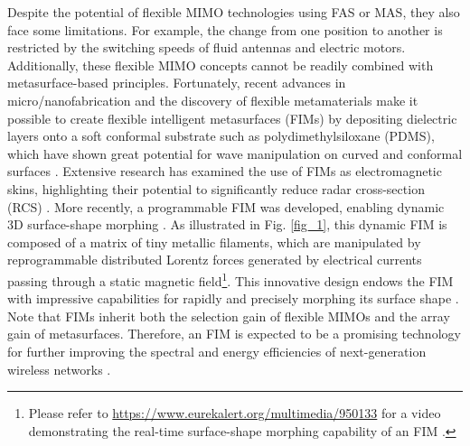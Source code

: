 \documentclass[lettersize,journal]{IEEEtran}
\begin{document}
Despite the potential of flexible MIMO technologies using FAS or MAS, they also face some limitations. For example, the change from one position to another is restricted by the switching speeds of fluid antennas and electric motors. Additionally, these flexible MIMO concepts cannot be readily combined with metasurface-based principles. Fortunately, recent advances in micro/nanofabrication and the discovery of flexible metamaterials make it possible to create flexible intelligent metasurfaces (FIMs) by depositing dielectric layers onto a soft conformal substrate such as polydimethylsiloxane (PDMS), which have shown great potential for wave manipulation on curved and conformal surfaces \cite{NC_2016_Kamali_Decoupling}. Extensive research has examined the use of FIMs as electromagnetic skins, highlighting their potential to significantly reduce radar cross-section (RCS) \cite{APSIS_2002_Georgakopoulos_HIRF, TAP_2020_Modi_Metasurface, ISAP_2018_Modi_Investigation}. More recently, a programmable FIM was developed, enabling dynamic 3D surface-shape morphing \cite{Nature_2022_Bai_A}. As illustrated in Fig. \ref{fig_1}, this dynamic FIM is composed of a matrix of tiny metallic filaments, which are manipulated by reprogrammable distributed Lorentz forces generated by electrical currents passing through a static magnetic field\footnote{Please refer to \url{https://www.eurekalert.org/multimedia/950133} for a video demonstrating the real-time surface-shape morphing capability of an FIM \cite{Nature_2022_Bai_A}.}. This innovative design endows the FIM with impressive capabilities for rapidly and precisely morphing its surface shape \cite{Nature_2022_Bai_A}. Note that FIMs inherit both the selection gain of flexible MIMOs and the array gain of metasurfaces. Therefore, an FIM is expected to be a promising technology for further improving the spectral and energy efficiencies of next-generation wireless networks \cite{ICC_2025_Jiancheng_Flexible, GLOBECOM_2025_Jiancheng_Downlink, TWC_2025_An_Flexible}.
\end{document}
